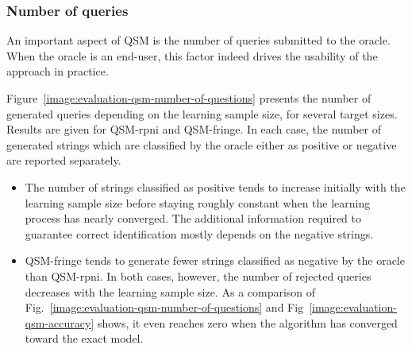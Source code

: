 \subsubsection*{Number of queries\label{subsection:evaluation-synthetic-queries-on-qsm}}

An important aspect of QSM is the number of queries submitted to the oracle. When the oracle is an end-user, this factor indeed drives the usability of the approach in practice. 

Figure~\ref{image:evaluation-qsm-number-of-questions} presents the number of generated queries depending on the learning sample size, for several target sizes. Results are given for QSM-rpni and QSM-fringe. In each case, the number of generated strings which are classified by the oracle either as positive or negative are reported separately.

\begin{itemize}
\item The number of strings classified as positive tends to increase initially with the learning sample size before staying roughly constant when the learning process has nearly converged. The additional information required to guarantee correct identification mostly depends on the negative strings.
\item QSM-fringe tends to generate fewer strings classified as negative by the oracle than QSM-rpni. In both cases, however, the number of rejected queries decreases with the learning sample size. As a comparison of Fig.~\ref{image:evaluation-qsm-number-of-questions} and Fig~\ref{image:evaluation-qsm-accuracy} shows, it even reaches zero when the algorithm has converged toward the exact model.
\end{itemize}

